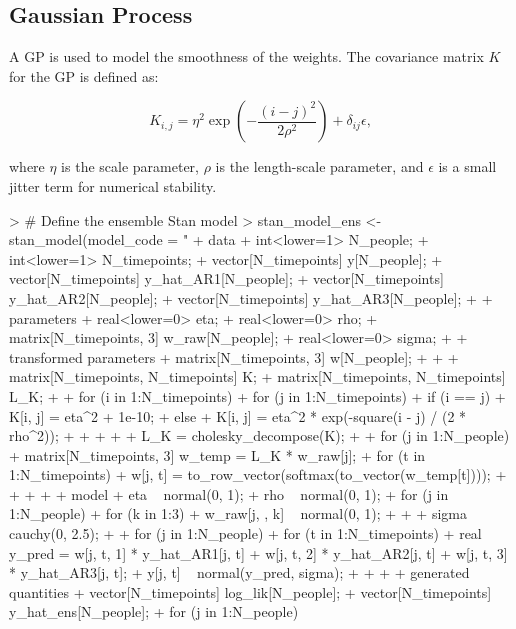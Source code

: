 \documentclass{article}
\begin{document}
\subsection{Gaussian Process}

A GP is used to model the smoothness of the weights. The covariance matrix $K$ for the GP is defined as:

\begin{equation}
  K_{i,j} = \eta^2 \exp\left(-\frac{(i - j)^2}{2 \rho^2}\right) + \delta_{ij} \epsilon,
\end{equation}

where $\eta$ is the scale parameter, $\rho$ is the length-scale parameter, and $\epsilon$ is a small jitter term for numerical stability.

\begin{Schunk}
\begin{Sinput}
> # Define the ensemble Stan model
> stan_model_ens <- stan_model(model_code = "
+ data {
+   int<lower=1> N_people;
+   int<lower=1> N_timepoints;
+   vector[N_timepoints] y[N_people];
+   vector[N_timepoints] y_hat_AR1[N_people];
+   vector[N_timepoints] y_hat_AR2[N_people];
+   vector[N_timepoints] y_hat_AR3[N_people];
+ }
+ parameters {
+   real<lower=0> eta;
+   real<lower=0> rho;
+   matrix[N_timepoints, 3] w_raw[N_people];
+   real<lower=0> sigma;
+ }
+ transformed parameters {
+   matrix[N_timepoints, 3] w[N_people];
+ 
+   {
+     matrix[N_timepoints, N_timepoints] K;
+     matrix[N_timepoints, N_timepoints] L_K;
+ 
+     for (i in 1:N_timepoints) {
+       for (j in 1:N_timepoints) {
+         if (i == j) {
+           K[i, j] = eta^2 + 1e-10;
+         } else {
+           K[i, j] = eta^2 * exp(-square(i - j) / (2 * rho^2));
+         }
+       }
+     }
+ 
+     L_K = cholesky_decompose(K);
+ 
+     for (j in 1:N_people) {
+       matrix[N_timepoints, 3] w_temp = L_K * w_raw[j];
+       for (t in 1:N_timepoints) {
+         w[j, t] = to_row_vector(softmax(to_vector(w_temp[t])));
+       }
+     }
+   }
+ }
+ model {
+   eta ~ normal(0, 1);
+   rho ~ normal(0, 1);
+   for (j in 1:N_people) {
+     for (k in 1:3) {
+       w_raw[j, , k] ~ normal(0, 1);
+     }
+   }
+   sigma ~ cauchy(0, 2.5);
+ 
+   for (j in 1:N_people) {
+     for (t in 1:N_timepoints) {
+       real y_pred = w[j, t, 1] * y_hat_AR1[j, t] + w[j, t, 2] * y_hat_AR2[j, t] + w[j, t, 3] * y_hat_AR3[j, t];
+       y[j, t] ~ normal(y_pred, sigma);
+     }
+   }
+ }
+ generated quantities {
+   vector[N_timepoints] log_lik[N_people];
+   vector[N_timepoints] y_hat_ens[N_people];
+   for (j in 1:N_people) {
}}
\end{Sinput}
\end{Schunk}
\end{document}
